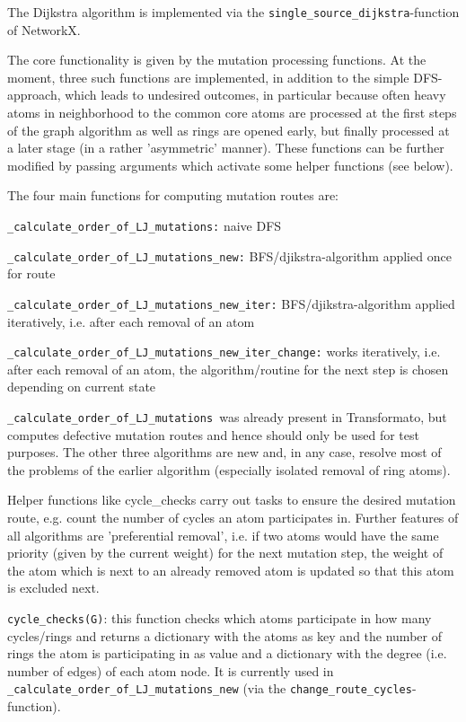 The Dijkstra algorithm is implemented via the \texttt{single\_source\_dijkstra}-function
of NetworkX.

The core functionality is given by the mutation processing functions.
At the moment, three such functions are implemented, in addition to
the simple DFS-approach, which leads to undesired outcomes, in particular because often heavy atoms in neighborhood to the common core atoms are processed at the first steps of the graph algorithm as well as rings are opened early, but finally processed at a later stage (in a rather 'asymmetric' manner). These functions
can be further modified by passing arguments which activate some helper
functions (see below).

The four main functions for computing mutation routes are: 

\texttt{\_calculate\_order\_of\_LJ\_mutations:} naive DFS 

\texttt{\_calculate\_order\_of\_LJ\_mutations\_new:} BFS/djikstra-algorithm
applied once for route

\texttt{\_calculate\_order\_of\_LJ\_mutations\_new\_iter:} BFS/djikstra-algorithm
applied iteratively, i.e. after each removal of an atom 

\texttt{\_calculate\_order\_of\_LJ\_mutations\_new\_iter\_change:}
works iteratively, i.e. after each removal of an atom, the algorithm/routine for the next step is chosen depending on current state

\texttt{\_calculate\_order\_of\_LJ\_mutations }was already present in Transformato, but computes defective mutation routes and hence
should only be used for test purposes. The other three algorithms
are new and, in any case, resolve most of the problems of the earlier
algorithm (especially isolated removal of ring atoms).

Helper functions like cycle\_checks carry out tasks to ensure the
desired mutation route, e.g. count the number of cycles an atom participates
in. Further features of all algorithms are 'preferential removal',
i.e. if two atoms would have the same priority (given by the current
weight) for the next mutation step, the weight of the atom which is
next to an already removed atom is updated so that this atom is excluded
next.

\texttt{cycle\_checks(G)}: this function checks which atoms participate
in how many cycles/rings and returns a dictionary with the atoms as
key and the number of rings the atom is participating in as value
and a dictionary with the degree (i.e. number of edges) of each atom
node. It is currently used in \texttt{\_calculate\_order\_of\_LJ\_mutations\_new}
(via the \texttt{change\_route\_cycles}-function).

